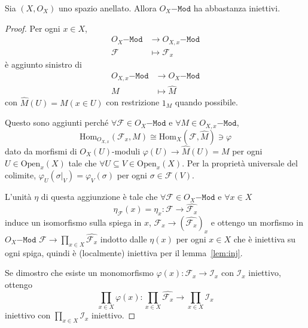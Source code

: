 \begin{proposition}{}
    Sia \({(X, O_X)}\) uno spazio anellato. Allora \(O_X\mathtt{-Mod}\) ha
    abbastanza iniettivi.
\end{proposition}
\begin{proof}{}
    Per ogni \(x \in X\), 
    \begin{align*}
        O_X\mathtt{-Mod} &\longrightarrow O_{X,x}\mathtt{-Mod} \\
         \mathcal{F}&\longmapsto \mathcal{F}_x
    \end{align*}
    è aggiunto sinistro di 
    \begin{align*}
        O_{X,x} \mathtt{-Mod}  &\longrightarrow O_X\mathtt{-Mod} \\
        M &\longmapsto \widehat{M}
    \end{align*}
    con \(\widehat{M}{(U)} = M {(x \in U)}\) con restrizione \(1_M\) quando
    possibile.

    Questo sono aggiunti perché \(\forall \mathcal{F} \in O_X\mathtt{-Mod}\) e
    \(\forall M \in O_{X,x}\mathtt{-Mod}\), 
    \[
      \mathrm{Hom}_{O_{X,x} } {(\mathcal{F}_x, M)} \cong
      \mathrm{Hom}_X{(\mathcal{F}, \widehat{M})} \ni \varphi 
    \]
    dato da morfismi di \(O_X{(U)}\)-moduli \(\varphi {(U)} \to \widehat{M}{(U)}
    = M\) per ogni \(U \in \mathrm{Open}_x{(X)}\) tale che \(\forall U \subseteq
    V \in \mathrm{Open}_x{(X)}\). Per la proprietà universale del colimite,
    \(\varphi _U{(\sigma|_V)} = \varphi_V{(\sigma)}\) per ogni \(\sigma \in
    \mathcal{F}{(V)}\).

    L'unità \(\eta\) di questa aggiunzione è tale che \(\forall \mathcal{F} \in
    O_X\mathtt{-Mod}\) e \(\forall x \in X\)
    \[
      \eta_\mathcal{F}{(x)} = \eta_x : \mathcal{F} \to \widehat{\mathcal{F}_x} 
    \]
    induce un isomorfismo sulla spiega in \(x\), \(\mathcal{F}_x \to {\left(
    \widehat{\mathcal{F}_x} \right)}_x\) e ottengo un morfismo in
    \(O_X\mathtt{-Mod}\) \(\mathcal{F} \to \prod_{x \in X}
    \widehat{\mathcal{F}_x}\) indotto dalle \(\eta{(x)}\) per ogni \(x \in X\)
    che è iniettiva su ogni spiga, quindi è (localmente) iniettiva per il
    lemma~\ref{lem:inj}.

    Se dimostro che esiste un monomorfismo \(\varphi {(x)} : \mathcal{F}_x \to
    \mathcal{I}_x\) con \(\mathcal{I}_x\) iniettivo, ottengo
    \[
      \prod_{x \in X} \varphi {(x)} : \prod_{x \in X} \widehat{\mathcal{F}_x}
      \to \prod_{x \in X} \mathcal{I}_x
    \]
    iniettivo con \(\prod_{x \in X} \mathcal{I}_x\) iniettivo.


\end{proof}
